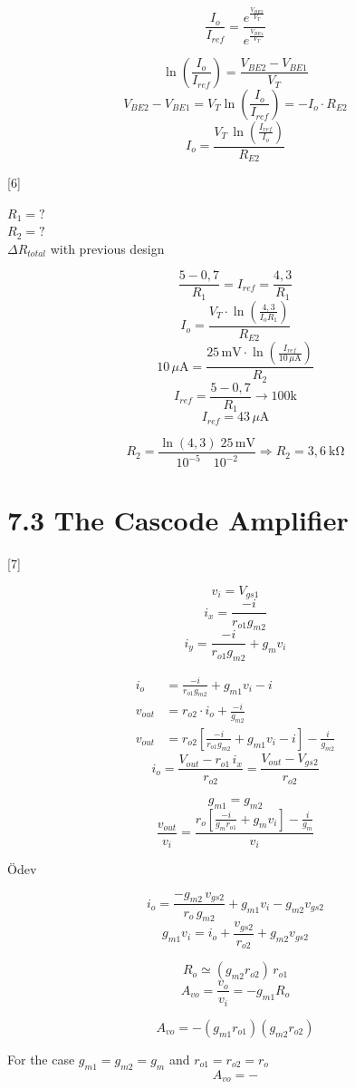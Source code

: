 \documentclass[11pt,a4paper]{article}
\begin{document}
\[ \frac{I_o}{I_{ref}} = \frac{e^{\frac{V_{BE2}}{V_T}}}{e^{\frac{V_{BE1}}{V_T}}} \]

\[ \ln\!\left(\frac{I_o}{I_{ref}}\right) = \frac{V_{BE2}-V_{BE1}}{V_T} \]
\[ V_{BE2} - V_{BE1} = V_T \ln\!\left(\frac{I_o}{I_{ref}}\right) = -I_o\cdot R_{E2} \]
\[ I_o = \frac{V_T\,\ln\!\left(\frac{I_{ref}}{I_o}\right)}{R_{E2}} \]

[6]

$R_1 = ?$\\
$R_2 = ?$\\
$\Delta R_{total}$ with previous design

\[ \frac{5-0{,}7}{R_1} = I_{ref} = \frac{4{,}3}{R_1} \]
\[ I_o = \frac{V_T \cdot \ln\!\left(\frac{4{,}3}{I_o R_1}\right)}{R_{E2}} \]
\[ 10\,\mu\mathrm{A} = \frac{25\,\mathrm{mV}\cdot\ln\!\left(\frac{I_{ref}}{10\,\mu\mathrm{A}}\right)}{R_2} \]
\[ I_{ref} = \frac{5-0{,}7}{R_1} \rightarrow 100\mathrm{k} \]
\[ I_{ref} = 43\,\mu\mathrm{A} \]

\[ R_2 = \frac{\ln(4{,}3)\;25\,\mathrm{mV}}{10^{-5}\quad 10^{-2}} \Rightarrow R_2 = 3{,}6\ \mathrm{k\Omega} \]

\section{7.3 The Cascode Amplifier}

[7]

\[ v_i = V_{gs1} \]
\[ i_x = \frac{-i}{r_{o1}g_{m2}} \]
\[ i_y = \frac{-i}{r_{o1}g_{m2}} + g_m v_i \]

\begin{align*}
i_o &= \frac{-i}{r_{o1}g_{m2}} + g_{m1}v_i - i \\
v_{out} &= r_{o2}\cdot i_o + \frac{-i}{g_{m2}} \\
v_{out} &= r_{o2}\left[\frac{-i}{r_{o1}g_{m2}} + g_{m1}v_i - i\right] - \frac{i}{g_{m2}}
\end{align*}
\[ i_o = \frac{V_{out} - r_{o1}\,i_x}{r_{o2}} = \frac{V_{out} - V_{gs2}}{r_{o2}} \]

\[ g_{m1} = g_{m2} \]
\[ \frac{v_{out}}{v_i} = \frac{r_o\left[\frac{-i}{g_m r_{o1}} + g_m v_i\right] - \frac{i}{g_m}}{v_i} \]

Ödev

\[ i_o = \frac{-g_{m2}\,v_{gs2}}{r_o\,g_{m2}} + g_{m1}v_i - g_{m2}v_{gs2} \]
\[ g_{m1}v_i = i_o + \frac{v_{gs2}}{r_{o2}} + g_{m2}v_{gs2} \]

\[ R_o \simeq (g_{m2}r_{o2})\,r_{o1} \]
\[ A_{vo} = \frac{v_o}{v_i} = -g_{m1}R_o \]

\[ A_{vo} = -(g_{m1}r_{o1})(g_{m2}r_{o2}) \]

For the case $g_{m1} = g_{m2} = g_m$ and $r_{o1} = r_{o2} = r_o$
\[ A_{vo} = - \]
\end{document}
